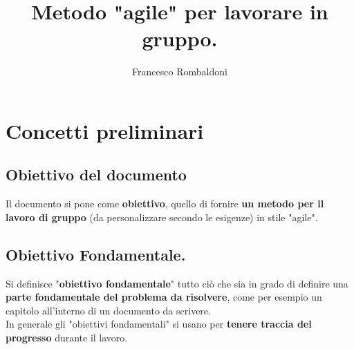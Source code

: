\documentclass[11pt,a4paper]{article}
\begin{document}
	\title{Metodo "agile" per lavorare in gruppo.}
	\author{Francesco Rombaldoni}
	\date{}
	\maketitle
	\newpage
	
	\section{Concetti preliminari}
	\subsection{Obiettivo del documento}
	Il documento si pone come \textbf{obiettivo}, quello di fornire \textbf{un metodo per il lavoro di gruppo} (da personalizzare secondo le esigenze) in stile "agile".\\
	
	\subsection{Obiettivo Fondamentale.}
	Si definisce "\textbf{obiettivo fondamentale}" tutto ciò che sia in grado di definire una \textbf{parte fondamentale del problema da risolvere}, come per esempio un capitolo all'interno di un documento da scrivere.\\
	In generale gli "obiettivi fondamentali" si usano per \textbf{tenere traccia del progresso} durante il lavoro.\\
	
\end{document}
